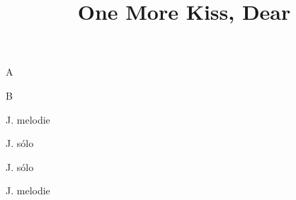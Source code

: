 \documentclass[timestamp]{jazzgrid}
\title{One More Kiss, Dear}
\begin{document}
\maketitle
\begin{musicsection}{A}
\barline
	{}
	{\barfour{}{}{}{}{}}
	{}
	{\barfour{}{}{}{}{}}
\barline
	{}
	{\barfour{}{}{}{}{}}
	{}
	{\barfour{}{}{}{}{}}
\barline
	{}
	{}
	{}
	{}
\barline
	{}
	{\barfour{}{}{}{}{}}
	{}
	{\barfour{}{}{}{}{}}
\barline
	{}
	{}
	{}
	{}
\end{musicsection}

\begin{musicsection}{B}
\barline
	{}
	{}
	{}
	{}
\barline
	{}
	{}
	{}
	{}
\end{musicsection}

\begin{multicols*}{2}
\begin{description}[noitemsep,align=right,labelwidth=\widthof{\bfseries{\scriptsize AABA}}]
	\scriptsize
	\item [AABA] J. melodie
	\item [AABA] J. sólo
	\item [AA\phantom{BA}] J. sólo
	\item [\phantom{AA}BA] J. melodie
\end{description}

\end{multicols*}
\end{document}
